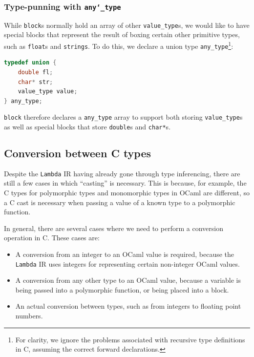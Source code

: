 \subsubsection{Type-punning with \texttt{any\char`_type}}

While \texttt{block}s normally hold an array of other \verb|value_type|s, we
would like to have special blocks that represent the result of boxing certain
other primitive types, such as \texttt{float}s and \texttt{strings}. To do this,
we declare a union type \verb|any_type|\footnote{For clarity, we ignore the
problems associated with recursive type definitions in C, assuming the correct
forward declarations.}:

\begin{lstlisting}[language=C]
typedef union {
    double fl;
    char* str;
    value_type value;
} any_type;
\end{lstlisting}

\texttt{block} therefore declares a \verb|any_type| array to support both
storing \verb|value_type|s as well as special blocks that store \verb|double|s
and \verb|char*|s.

\subsection{Conversion between C types} \label{casting}

Despite the \texttt{Lambda} IR having already gone through type inferencing,
there are still a few cases in which ``casting'' is necessary. This is because,
for example, the C types for polymorphic types and monomorphic types in OCaml
are different, so a C cast is necessary when passing a value of a known type to
a polymorphic function.

In general, there are several cases where we need to perform a conversion
operation in C. These cases are: 

\begin{itemize}

\item A conversion from an integer to an OCaml value is required, because the
    \texttt{Lambda} IR uses integers for representing certain non-integer OCaml
    values.

\item A conversion from any other type to an OCaml value, because a variable is
    being passed into a polymorphic function, or being placed into a block.

\item An actual conversion between types, such as from integers to floating
    point numbers.

\end{itemize}

